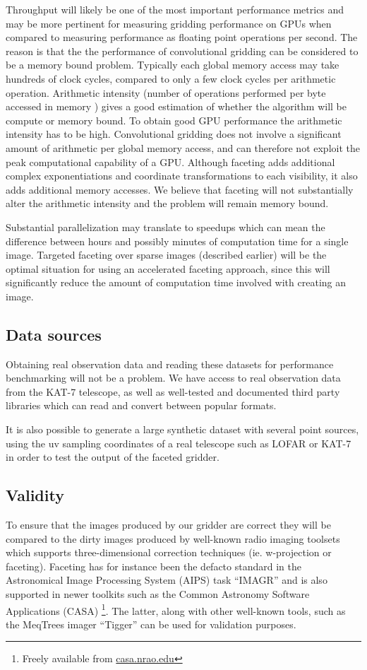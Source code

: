 \documentclass[a4paper, two column]{article}
\begin{document}
Throughput will likely be one of the most important performance metrics and may be more pertinent for measuring gridding performance on GPUs when compared to measuring performance 
as floating point operations per second. The reason is that the the performance of convolutional gridding can be considered to be a memory bound problem. Typically each global memory access may take hundreds of 
clock cycles, compared to only a few clock cycles per arithmetic operation. Arithmetic intensity (number of operations performed per byte accessed in memory \cite{sclocco2014auto}) gives a good estimation of 
whether the algorithm will be compute or memory bound. To obtain good GPU performance the arithmetic intensity has to be high. Convolutional gridding does not involve a significant amount of arithmetic per 
global memory access, and can therefore not exploit the peak computational capability of a GPU. Although faceting adds additional complex exponentiations and coordinate transformations to each visibility, it 
also adds additional memory accesses. We believe that faceting will not substantially alter the arithmetic intensity and the problem will remain memory bound.

Substantial parallelization may translate to speedups which can mean the difference between hours and possibly minutes of computation time for a single image. Targeted faceting over sparse images (described earlier) will
be the optimal situation for using an accelerated faceting approach, since this will significantly reduce the amount of computation time involved with creating an image. 

\subsection{Data sources}
Obtaining real observation data and reading these datasets for performance benchmarking will not be a problem. We have access to real observation data 
from the KAT-7 telescope, as well as well-tested and documented third party libraries which can read and convert between popular formats. 

It is also possible to generate a large synthetic dataset with several point sources, using the uv sampling coordinates of a real telescope such as LOFAR or KAT-7 in order to 
test the output of the faceted gridder.

\subsection{Validity}
To ensure that the images produced by our gridder are correct they will be compared to the dirty images produced by well-known radio imaging toolsets which supports three-dimensional correction techniques (ie. w-projection or faceting). Faceting has
for instance been the defacto standard in the Astronomical Image Processing System (AIPS) task ``IMAGR'' \cite{AIPS113} and is also supported in newer toolkits such as the Common Astronomy Software Applications (CASA) \footnote{Freely available from \url{casa.nrao.edu}}. 
The latter, along with other well-known tools, such as the MeqTrees imager ``Tigger'' can be used for validation purposes.
\end{document}
